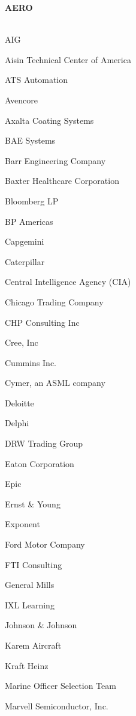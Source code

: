 \documentclass[twoside]{article}
\begin{document}
    \begin{center}\begin{multicols}{5}
    {\fontsize{14}{16}\selectfont \bf AERO}\\
        \vspace{-1em}
        ~\hrulefill~
        \vspace{-.9em}
        \begin{FlushLeft}
        \begin{compactitem}
        \item AIG
\item Aisin Technical Center of America
\item ATS Automation
\item Avencore
\item Axalta Coating Systems
\item BAE Systems
\item Barr Engineering Company
\item Baxter Healthcare Corporation
\item Bloomberg LP
\item BP Americas
\item Capgemini
\item Caterpillar
\item Central Intelligence Agency (CIA)
\item Chicago Trading Company
\item CHP Consulting Inc
\item Cree, Inc
\item Cummins Inc.
\item Cymer, an ASML company
\item Deloitte
\item Delphi
\item DRW Trading Group
\item Eaton Corporation
\item Epic
\item Ernst \& Young
\item Exponent
\item Ford Motor Company
\item FTI Consulting
\item General Mills
\item IXL Learning
\item Johnson \& Johnson
\item Karem Aircraft
\item Kraft Heinz
\item Marine Officer Selection Team
\item Marvell Semiconductor, Inc.

\end{compactitem}
\end{FlushLeft}
\end{multicols}
\end{center}
\end{document}
